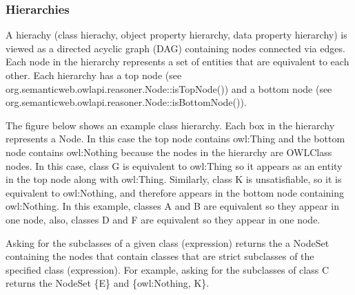 \subsubsection*{Hierarchies}

A hierachy (class hierachy, object property hierarchy, data property hierarchy) is viewed as a directed acyclic graph (D\-A\-G) containing nodes connected via edges. Each node in the hierarchy represents a set of entities that are equivalent to each other. Each hierarchy has a top node (see org.\-semanticweb.\-owlapi.\-reasoner.\-Node\-::is\-Top\-Node()) and a bottom node (see org.\-semanticweb.\-owlapi.\-reasoner.\-Node\-::is\-Bottom\-Node()). 

The figure below shows an example class hierarchy. Each box in the hierarchy represents a {\ttfamily Node}. In this case the top node contains {\ttfamily owl\-:Thing} and the bottom node contains {\ttfamily owl\-:Nothing} because the nodes in the hierarchy are {\ttfamily O\-W\-L\-Class} nodes. In this case, class {\ttfamily G} is equivalent to {\ttfamily owl\-:Thing} so it appears as an entity in the top node along with {\ttfamily owl\-:Thing}. Similarly, class {\ttfamily K} is unsatisfiable, so it is equivalent to {\ttfamily owl\-:Nothing}, and therefore appears in the bottom node containing {\ttfamily owl\-:Nothing}. In this example, classes {\ttfamily A} and {\ttfamily B} are equivalent so they appear in one node, also, classes {\ttfamily D} and {\ttfamily F} are equivalent so they appear in one node. 

Asking for the subclasses of a given class (expression) returns the a {\ttfamily Node\-Set} containing the nodes that contain classes that are strict subclasses of the specified class (expression). For example, asking for the subclasses of class {\ttfamily C} returns the {\ttfamily Node\-Set} {\ttfamily \{E\}} and {\ttfamily \{owl\-:Nothing, K\}}. 

